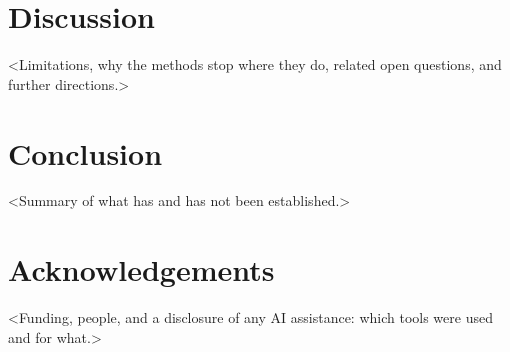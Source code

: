 \documentclass[11pt]{amsart}
\theoremstyle{plain}
\theoremstyle{definition}
\theoremstyle{remark}
\numberwithin{equation}{section}
\begin{document}
\section{Discussion}\label{sec:discussion}
<Limitations, why the methods stop where they do, related open questions, and further directions.>

\section{Conclusion}\label{sec:conclusion}
<Summary of what has and has not been established.>

\section*{Acknowledgements}
<Funding, people, and a disclosure of any AI assistance: which tools were used and for what.>




\end{document}
